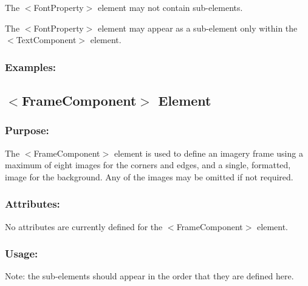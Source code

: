 \begin{DoxyItemize}
\item The {\ttfamily $<$Font\+Property$>$} element may not contain sub-\/elements. 
\item The {\ttfamily $<$Font\+Property$>$} element may appear as a sub-\/element only within the {\ttfamily $<$Text\+Component$>$} element. 
\end{DoxyItemize}\hypertarget{fal_element_ref_fal_elem_ref_sec_13_4}{}\subsubsection{Examples\+:}\label{fal_element_ref_fal_elem_ref_sec_13_4}
\hypertarget{fal_element_ref_fal_elem_ref_sec_14}{}\subsection{$<$\+Frame\+Component$>$ Element}\label{fal_element_ref_fal_elem_ref_sec_14}
\hypertarget{fal_element_ref_fal_elem_ref_sec_14_1}{}\subsubsection{Purpose\+:}\label{fal_element_ref_fal_elem_ref_sec_14_1}
The {\ttfamily $<$Frame\+Component$>$} element is used to define an imagery frame using a maximum of eight images for the corners and edges, and a single, formatted, image for the background. Any of the images may be omitted if not required.\hypertarget{fal_element_ref_fal_elem_ref_sec_14_2}{}\subsubsection{Attributes\+:}\label{fal_element_ref_fal_elem_ref_sec_14_2}
No attributes are currently defined for the {\ttfamily $<$Frame\+Component$>$} element.\hypertarget{fal_element_ref_fal_elem_ref_sec_14_3}{}\subsubsection{Usage\+:}\label{fal_element_ref_fal_elem_ref_sec_14_3}
Note\+: the sub-\/elements should appear in the order that they are defined here.


